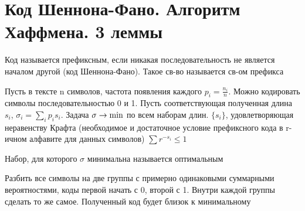 \documentclass[discrete.tex]{subfiles}
\begin{document}
\section{Код Шеннона-Фано. Алгоритм Хаффмена. 3 леммы}

\begin{definition}
  Код называется префиксным, если никакая последовательность не является началом другой (код Шеннона-Фано). Такое св-во называется св-ом префикса
\end{definition}

\begin{task}
  Пусть в тексте n символов, частота появления каждого $p_i = \frac{n_i}{n}$. Можно кодировать символы последовательностью 0 и 1. Пусть соответствующая полученная длина $s_i$, $\sigma_i = \sum_i p_i s_i$. Задача $\sigma \rightarrow \min$ по всем наборам длин. $\{s_i\}$, удовлетворяющая неравенству Крафта (необходимое и достаточное условие префиксного кода в r-ичном алфавите для данных символов) $\sum r^{-s_i} \leq 1$
\end{task}

\begin{definition}
  Набор, для которого $\sigma$ минимальна называется оптимальным
\end{definition}

\begin{sol}
  Разбить все символы на две группы с примерно одинаковыми суммарными вероятностями, коды первой начать с 0, второй с 1. Внутри каждой группы сделать то же самое. Полученный код будет близок к минимальному
\end{sol}
\end{document}
